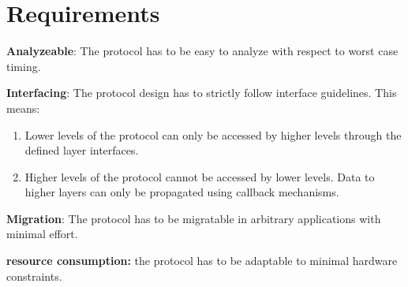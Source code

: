 \section{Requirements}
\label{sec:bus:requirements}

\begin{req}
\label{req:ulftrtp:analyzeable}
\textbf{Analyzeable}: The protocol has to be easy to analyze with respect to worst case timing.
\end{req}

\begin{req}
\label{req:ulftrtp:interfacing}
\textbf{Interfacing}: The protocol design has to strictly follow interface guidelines. This means:
\begin{enumerate}
 \item Lower levels of the protocol can only be accessed by higher levels through the defined layer interfaces.
 \item Higher levels of the protocol cannot be accessed by lower levels. Data to higher layers can only be propagated 
using callback mechanisms. 
\end{enumerate}
\end{req}

\begin{req}
\label{req:ulftrtp:easy migration}
\textbf{Migration}: The protocol has to be migratable in arbitrary applications with minimal effort.
\end{req}

\begin{req}
\label{req:ulftrtp:resource consumption}
\textbf{resource consumption: }the protocol has to be adaptable to minimal hardware constraints.
\end{req}
